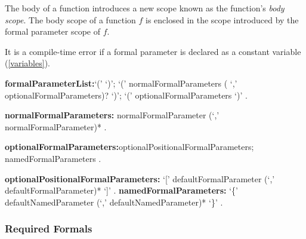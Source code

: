 \documentclass{article}
\begin{document}
\LMHash{}
The body of a function introduces a new scope known as the function's {\em  body scope}. The body scope of a function $f$  is enclosed  in the scope introduced by the formal parameter scope of $f$.




\LMHash{}
It is a compile-time error if a formal parameter is declared as a constant variable (\ref{variables}).

\begin{grammar}
{\bf formalParameterList:}`(' `)';
 `(' normalFormalParameters ( `,'  optionalFormalParameters)? `)';
  `(' optionalFormalParameters `)'
   .


{\bf normalFormalParameters:}
      normalFormalParameter (`,' normalFormalParameter)*
    .

{\bf optionalFormalParameters:}optionalPositionalFormalParameters;
      namedFormalParameters
    .

{\bf optionalPositionalFormalParameters:}
      `[' defaultFormalParameter (`,' defaultFormalParameter)* `]'
    .
{\bf namedFormalParameters:}
      `\{' defaultNamedParameter (`,' defaultNamedParameter)* `\}'
    .
\end{grammar}



\subsubsection{Required Formals} 
\end{document}
